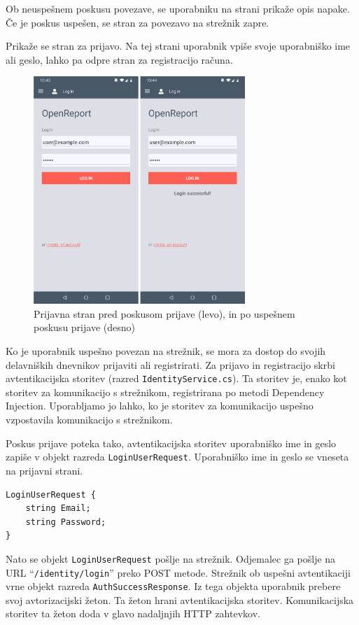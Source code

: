 \documentclass[a4paper, 12pt]{book}
\begin{document}
Ob neuspešnem poskusu povezave, se uporabniku na strani prikaže opis napake.
Če je poskus uspešen, se stran za povezavo na strežnik zapre.

Prikaže se stran za prijavo.
Na tej strani uporabnik vpiše svoje uporabniško ime ali geslo, lahko pa odpre stran za registracijo računa.

\begin{figure}[H]
\begin{center}
\includegraphics[width=8cm]{app_login}
\end{center}
	\caption{Prijavna stran pred poskusom prijave (levo), in po uspešnem poskusu prijave (desno)}
\label{app_login}
\end{figure}

Ko je uporabnik uspešno povezan na strežnik, se mora za dostop do svojih delavniških dnevnikov prijaviti ali registrirati.
Za prijavo in registracijo skrbi avtentikacijska storitev (razred \texttt{IdentityService.cs}).
Ta storitev je, enako kot storitev za komunikacijo s strežnikom, registrirana po metodi Dependency Injection.
Uporabljamo jo lahko, ko je storitev za komunikacijo uspešno vzpostavila komunikacijo s strežnikom.

Poskus prijave poteka tako, avtentikacijska storitev uporabniško ime in geslo zapiše v objekt razreda \texttt{LoginUserRequest}.
Uporabniško ime in geslo se vneseta na prijavni strani.

\begin{Verbatim}[commandchars=+\[\]]
LoginUserRequest {
    string Email; 
    string Password;
}
\end{Verbatim}

Nato se objekt \texttt{LoginUserRequest} pošlje na strežnik.
Odjemalec ga pošlje na URL \enquote{\texttt{/identity/login}} preko POST metode.
Strežnik ob uspešni avtentikaciji vrne objekt razreda \texttt{AuthSuccessResponse}.
Iz tega objekta uporabnik prebere svoj avtorizacijski žeton.
Ta žeton hrani avtentikacijska storitev.
Komunikacijska storitev ta žeton doda v glavo nadaljnjih HTTP zahtevkov.
\end{document}
